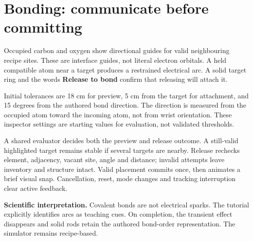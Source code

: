 \section*{Bonding: communicate before committing}
Occupied carbon and oxygen show directional guides for valid neighbouring recipe sites. These are interface guides, not literal electron orbitals. A held compatible atom near a target produces a restrained electrical arc. A solid target ring and the words \textbf{Release to bond} confirm that releasing will attach it.

Initial tolerances are 18 cm for preview, 5 cm from the target for attachment, and 15 degrees from the authored bond direction. The direction is measured from the occupied atom toward the incoming atom, not from wrist orientation. These inspector settings are starting values for evaluation, not validated thresholds.



A shared evaluator decides both the preview and release outcome. A still-valid highlighted target remains stable if several targets are nearby. Release rechecks element, adjacency, vacant site, angle and distance; invalid attempts leave inventory and structure intact. Valid placement commits once, then animates a brief visual snap. Cancellation, reset, mode changes and tracking interruption clear active feedback.

\textbf{Scientific interpretation.} Covalent bonds are not electrical sparks. The tutorial explicitly identifies arcs as teaching cues. On completion, the transient effect disappears and solid rods retain the authored bond-order representation. The simulator remains recipe-based.

